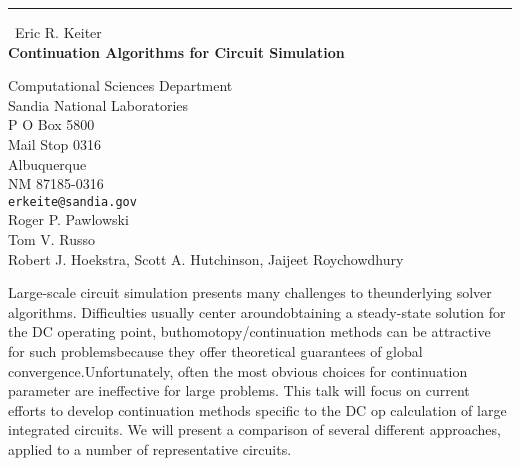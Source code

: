 \documentclass{report}
\begin{document}
\begin{center}
\rule{6in}{1pt} \
{\large Eric R. Keiter \\
{\bf Continuation Algorithms for Circuit Simulation}}

Computational Sciences Department \\ Sandia National Laboratories \\ P O Box 5800 \\ Mail Stop 0316 \\ Albuquerque \\ NM 87185-0316
\\
{\tt erkeite@sandia.gov}\\
Roger P.  Pawlowski\\
 Tom V.  Russo\\
	Robert J. Hoekstra, Scott A. Hutchinson, Jaijeet Roychowdhury\end{center}

Large-scale circuit simulation presents many challenges to theunderlying solver algorithms.
Difficulties usually center aroundobtaining a steady-state solution for the DC operating point,
buthomotopy/continuation methods can be attractive for such problemsbecause they offer theoretical guarantees of global convergence.Unfortunately,
often the most obvious choices for continuation parameter are ineffective for large problems.
This talk will focus on current efforts to develop continuation methods specific to the DC op calculation of large integrated circuits.
We will present a comparison of several different approaches,
applied to a number of representative circuits.
\end{document}
